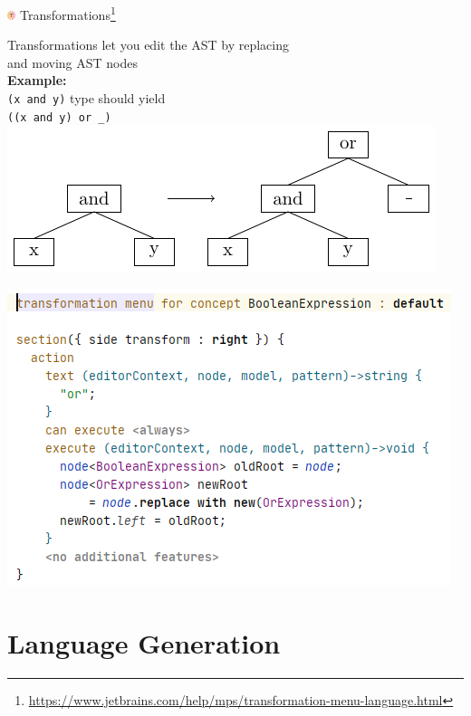 	\begin{frame}{\includegraphics[height=0.25cm]{graphics/transformation.png} Transformations\footnote{\url{https://www.jetbrains.com/help/mps/transformation-menu-language.html}}}
		\begin{minipage}{0.52\textwidth}
			Transformations let you edit the AST by replacing \\
			and moving AST nodes\\
			
			\textbf{Example:}\\
			\texttt{(x and y)} type  should yield \\
			\texttt{((x and y) or \_)}\\
			\includegraphics[height=0.4\textheight]{tikz/transformation.pdf}
		\end{minipage}
		\begin{minipage}{0.4\textwidth}
			\includegraphics[height=0.75\textheight]{illustrations/transformation.png}
		\end{minipage}
	\end{frame}

	\section{Language Generation}
	
